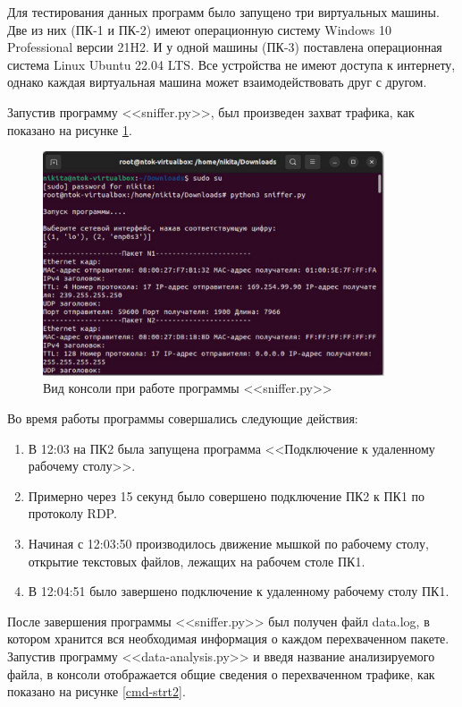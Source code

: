 \documentclass[bachelor, och, coursework]{SCWorks}
\begin{document}
  Для тестирования данных программ было запущено три виртуальных машины. Две из них (ПК-1 и ПК-2) имеют операционную систему Windows 10 Professional версии 21H2.
  И у одной машины (ПК-3) поставлена операционная система Linux Ubuntu 22.04 LTS. Все устройства не имеют доступа к интернету, однако каждая виртуальная машина 
  может взаимодействовать друг с другом.

  Запустив программу <<sniffer.py>>, был произведен захват трафика, как показано на рисунке \ref{cmd-strt}.
  
  \begin{figure}[H]
    \centering
    \includegraphics[width=0.9\textwidth]{photo/cmd-start.jpg}
    \caption{Вид консоли при работе программы <<sniffer.py>>}
    \label{cmd-strt}
  \end{figure}
  
  Во время работы программы совершались следующие действия:

  \begin{enumerate}
    \item В 12:03 на ПК2 была запущена программа <<Подключение к удаленному рабочему столу>>.
    \item Примерно через 15 секунд было совершено подключение ПК2 к ПК1 по протоколу RDP.
    \item Начиная с 12:03:50 производилось движение мышкой по рабочему столу, открытие текстовых файлов, лежащих на рабочем 
    столе ПК1.
    \item В 12:04:51 было завершено подключение к удаленному рабочему столу ПК1.
  \end{enumerate}
  
  После завершения программы <<sniffer.py>> был получен файл data.log, в котором хранится вся необходимая информация о каждом перехваченном пакете.
  Запустив программу <<data-analysis.py>> и введя название анализируемого файла, в консоли отображается общие сведения о перехваченном трафике, как показано
  на рисунке \ref{cmd-strt2}.
  
\end{document}
